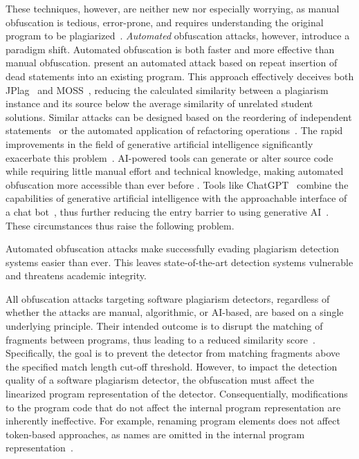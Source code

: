 These techniques, however, are neither new nor especially worrying, as manual obfuscation is tedious, error-prone, and requires understanding the original program to be plagiarized~\cite{Joy1999}.
\textit{Automated} obfuscation attacks, however, introduce a paradigm shift. Automated obfuscation is both faster and more effective than manual obfuscation.
\citet{DevoreMcDonald2020} present an automated attack based on repeat insertion of dead statements into an existing program.
This approach effectively deceives both JPlag~\cite{prechelt2002} and MOSS~\cite{MOSS}, reducing the calculated similarity between a plagiarism instance and its source below the average similarity of unrelated student solutions.
Similar attacks can be designed based on the reordering of independent statements~\cite{Broedel2023} or the automated application of refactoring operations~\cite{Maisch2024}. 
The rapid improvements in the field of generative artificial intelligence significantly exacerbate this problem~\cite{Lancaster2023}.
AI-powered tools can generate or alter source code~\cite{Camara2023, Daun2023} while requiring little manual effort and technical knowledge, making automated obfuscation more accessible than ever before \cite{Biderman2022, Khalil_Er_2023}. Tools like ChatGPT~\cite{ChatGPT} combine the capabilities of generative artificial intelligence with the approachable interface of a chat bot~\cite{Saglam2024a}, thus further reducing the entry barrier to using generative AI~\cite{ChatGPTGuide}.
These circumstances thus raise the following problem.
%
    \begin{problem}\label{problem1}
    Automated obfuscation attacks make successfully evading plagiarism detection systems easier than ever. This leaves state-of-the-art detection systems vulnerable and threatens academic integrity.
    \end{problem}
%
All obfuscation attacks targeting software plagiarism detectors, regardless of whether the attacks are manual, algorithmic, or AI-based, are based on a single underlying principle.
%
Their intended outcome is to disrupt the matching of fragments between programs, thus leading to a reduced similarity score~\cite{DevoreMcDonald2020}.
Specifically, the goal is to prevent the detector from matching fragments above the specified match length cut-off threshold.
However, to impact the detection quality of a software plagiarism detector, the obfuscation must affect the linearized program representation of the detector. Consequentially, modifications to the program code that do not affect the internal program representation are inherently ineffective. For example, renaming program elements does not affect token-based approaches, as names are omitted in the internal program representation~\cite{prechelt2000, Saglam2024a}.
